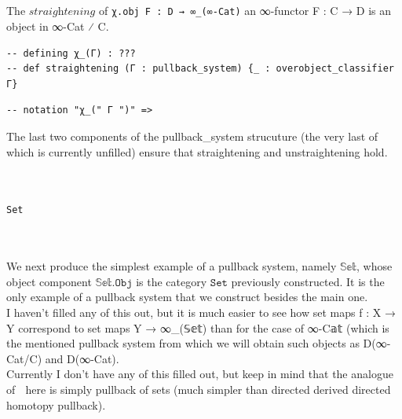 \documentclass{book}
\theoremstyle{definition}
\newcounter{pcounter}
\newcounter{lcounter}
\newcounter{sectioncount}
\newcounter{subsectioncount}
\renewcommand{\section}[1]{\newpage\ \\ \ \\ \begin{center} \scalebox{1.5}{\texttt{\thesectioncount . #1}} \stepcounter{sectioncount} \setcounter{subsectioncount}{1} \end{center} \begin{center} \ \\ \ \\ \thispagestyle{empty} \end{center}}
\renewcommand{\chapter}[1]{
\newpage
{
\Huge 
\begin{center}
\ \\
\ \\
\thispagestyle{empty}
\texttt{#1}
\end{center}}
\ \\
\ \\
}
\begin{document}
\section{$\texttt{χ\_(Γ)}$}
The $\textit{straightening}$ of \texttt{χ.obj F : D → ∞\_(∞-Cat)} an ∞-functor F : C → D is an
object in ∞-Cat ⁄ C.
\begin{center} \begin{tcolorbox}[width=5in,colback={white},title={\begin{center}\texttt{Lean \thelcounter} \addtocounter{lcounter}{1} \end{center}},colbacktitle=Blue,coltitle=black] \begin{verbatim}
-- defining χ_(Γ) : ???
-- def straightening (Γ : pullback_system) {_ : overobject_classifier Γ}
\end{verbatim} \end{tcolorbox} \end{center}
\begin{center}

 \begin{tcolorbox}[width=5in,colback={white},title={\begin{center}\texttt{Lean \thelcounter} \addtocounter{lcounter}{1} \end{center}},colbacktitle=Blue,coltitle=black] \begin{verbatim}
-- notation "χ_(" Γ ")" =>
\end{verbatim} \end{tcolorbox} \end{center}
The last two components of the pullback\_system strucuture (the very last of which is currently unfilled) ensure that straightening and unstraightening hold.\\
\chapter{Set}
We next produce the simplest example of a pullback system, namely $\texttt{𝕊𝕖𝕥}$, whose object component $\texttt{𝕊𝕖𝕥.Obj}$ is the category $\texttt{Set}$ previously constructed. It is the only example of a pullback system that we construct besides the main one.\\
I haven't filled any of this out, but it is much easier to see how set maps f : X → Y correspond to set maps Y → ∞\_(𝕊𝕖𝕥) than for the case of ∞-C𝕒𝕥 (which is the mentioned pullback system from which we will obtain such objects as D(∞-Cat/C) and D(∞-Cat).\\
Currently I don't have any of this filled out, but keep in mind that the analogue of ω⃗ here is simply pullback of sets (much simpler than directed derived directed homotopy pullback).\\
\end{document}
